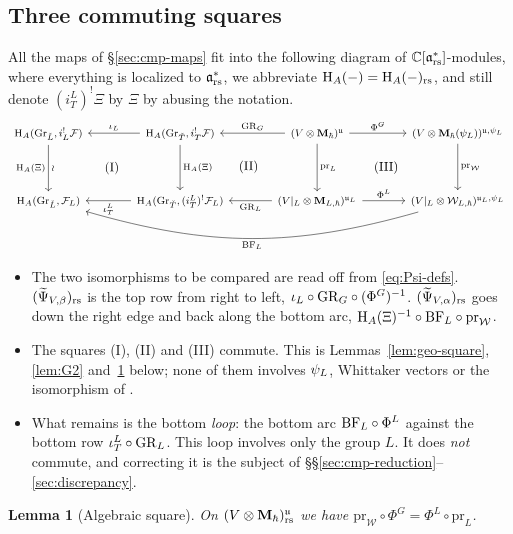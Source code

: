 \documentclass{article}
\theoremstyle{plain}
\newtheorem{lemma}[theorem]{Lemma}
\theoremstyle{definition}
\theoremstyle{remark}
\numberwithin{equation}{section}
\begin{document}
\subsection{Three commuting squares}\label{sec:cmp-squares}
All the maps of \S\ref{sec:cmp-maps} fit into the following diagram of $\mathbb{C}[\mathfrak{a}^*_{\mathrm{rs}}]$-modules, where everything is localized to $\mathfrak{a}^*_{\mathrm{rs}}$, we abbreviate $\mathrm{H}_A(-)=\mathrm{H}_A(-)_{\mathrm{rs}}$, and still denote $(i^L_T)^!\Xi$ by $\Xi$ by abusing the notation.
\begin{equation}\label{eq:big-diagram}
\begin{tikzcd}[column sep=3.4em,row sep=3.6em,cells={nodes={font=\footnotesize}}]
\H_A(\GrL,i_L^!\calF)\arrow[d,"\H_A(\Xi)"',"\wr"]
& \H_A(\GrT,i_T^!\calF)\arrow[l,"\iota_L"']\arrow[d,"\H_A(\Xi)"]\arrow[dl,phantom,"\mathrm{(I)}"]
& (V\otimes\bM_\hbar)^{\fraku}\arrow[l,"\GR_G"']\arrow[r,"\Phi^G"]\arrow[d,"\mathrm{pr}_L"]\arrow[dl,phantom,"\mathrm{(II)}"]
& (V\otimes\bM_\hbar(\psiL))^{\fraku,\psiL}\arrow[d,"\mathrm{pr}_{\mathcal{W}}"]\arrow[dl,phantom,"\mathrm{(III)}"]
\\
\H_A(\GrL,\calF_L)
& \H_A(\GrT,(i^L_T)^!\calF_L)\arrow[l,"\iota^L_T"]
& (V|_L\otimes\bM_{L,\hbar})^{\fraku_L}\arrow[l,"\GR_L"]\arrow[r,"\Phi^L"]
& (V|_L\otimes\calW_{L,\hbar})^{\fraku_L,\psiL}\arrow[lll,bend left=16,"\BF_L"]
\end{tikzcd}
\end{equation}
\begin{itemize}
\item The two isomorphisms to be compared are read off from \eqref{eq:Psi-defs}. $(\widetilde\Psi_{V,\beta})_{\mathrm{rs}}$ is the top row from right to left, $\iota_L\circ\mathrm{GR}_G\circ(\Phi^G)^{-1}$. $(\widetilde\Psi_{V,\alpha})_{\mathrm{rs}}$ goes down the right edge and back along the bottom arc, $\mathrm{H}_A(\Xi)^{-1}\circ\mathrm{BF}_L\circ\mathrm{pr}_{\mathcal{W}}$.
\item The squares (I), (II) and (III) commute. This is Lemmas~\ref{lem:geo-square}, \ref{lem:G2} and~\ref{lem:alg-square} below; none of them involves $\psi_L$, Whittaker vectors or the isomorphism of \cite{bezrukavnikov2026equivariantsatakecategorykostantwhittaker}.
\item What remains is the bottom \emph{loop}: the bottom arc $\mathrm{BF}_L\circ\Phi^L$ against the bottom row $\iota^L_T\circ\mathrm{GR}_L$. This loop involves only the group $L$. It does \emph{not} commute, and correcting it is the subject of \S\S\ref{sec:cmp-reduction}--\ref{sec:discrepancy}.
\end{itemize}

\begin{lemma}[Algebraic square]\label{lem:alg-square}
On $(V\otimes\mathbf{M}_\hbar)^{\mathfrak{u}}_{\mathrm{rs}}$ we have $\mathrm{pr}_{\mathcal{W}}\circ\Phi^G=\Phi^L\circ\mathrm{pr}_L$.
\end{lemma}
\end{document}
